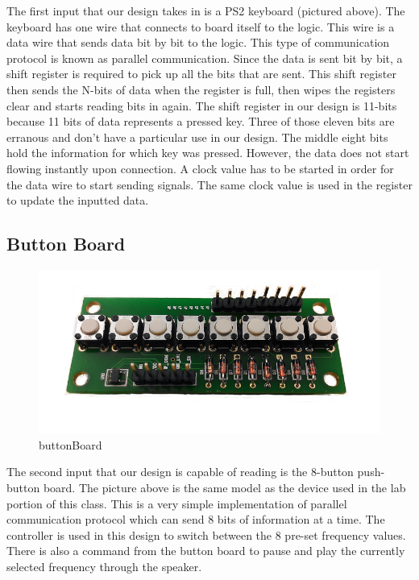 \documentclass[a4paper]{article}
\begin{document}
The first input that our design takes in is a PS2 keyboard (pictured above). The keyboard has one wire that connects to board itself to the logic. This wire is a data wire that sends data bit by bit to the logic. This type of communication protocol is known as parallel communication. Since the data is sent bit by bit, a shift register is required to pick up all the bits that are sent. This shift register then sends the N-bits of data when the register is full, then wipes the registers clear and starts reading bits in again. The shift register in our design is 11-bits because 11 bits of data represents a pressed key. Three of those eleven bits are erranous and don’t have a particular use in our design. The middle eight bits hold the information for which key was pressed. However, the data does not start flowing instantly upon connection. A clock value has to be started in order for the data wire to start sending signals. The same clock value is used in the register to update the inputted data. \pagebreak

\subsection{Button Board}

\begin{figure}[h]
    \includegraphics[width=6 in]{./Images/bBoard.png}
    \caption{buttonBoard}
    \label{fig:3}
\end{figure} 

The second input that our design is capable of reading is the 8-button push-button board. The picture above is the same model as the device used in the lab portion of this class. This is a very simple implementation of parallel communication protocol which can send 8 bits of information at a time. The controller is used in this design to switch between the 8 pre-set frequency values. There is also a command from the button board to pause and play the currently selected frequency through the speaker.
\end{document}
